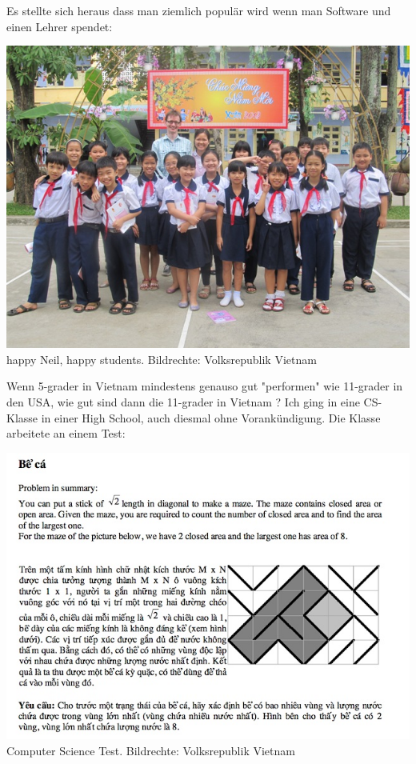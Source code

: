 \documentclass[10pt,a4paper,ngerman,twoside]{article} %
\begin{document}
\begin{multicols}{3}
Es stellte sich heraus dass man ziemlich populär wird wenn man Software und einen Lehrer spendet:
\begin{center}
\includegraphics[width=\linewidth]{vietnam/vietnam_happy.jpg}
\footnotesize{happy Neil, happy students. Bildrechte: Volksrepublik Vietnam}
\end{center}

Wenn 5-grader in Vietnam mindestens genauso gut "performen" wie 11-grader in den USA, wie gut sind dann die 11-grader in Vietnam ? Ich ging in eine CS-Klasse in einer High School, auch diesmal ohne Vorankündigung. Die Klasse arbeitete an einem Test:

\begin{center}
\includegraphics[width=\linewidth]{vietnam/vietnam_test.jpg}
\footnotesize{Computer Science Test. Bildrechte: Volksrepublik Vietnam}
\end{center}


\end{multicols}
\end{document}
